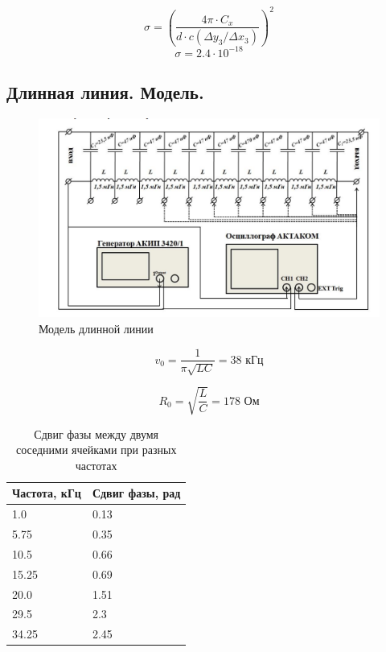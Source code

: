 \documentclass[a4paper,12 pt]{article}
\begin{document}
\begin{equation*}
\sigma=\left(\frac{4 \pi \cdot C_{x}}{d \cdot c\left(\Delta y_{3} / \Delta x_{3}\right)}\right)^{2} \tag{48}
\end{equation*}
\[\sigma = 2.4 \cdot 10^{-18}\]



\subsection{Длинная линия. Модель.}
\begin{figure}[H]
    \centering
    \includegraphics[scale=0.6]{3.png}
    \caption{Модель длинной линии}
    \label{fig:enter-label}
\end{figure}

\begin{equation*}
v_{0}=\frac{1}{\pi \sqrt{L C}} = 38 \text{ кГц} \tag{*}
\end{equation*}


\begin{equation*}
R_{0}=\sqrt{\frac{L}{C}} = 178 \text{ Ом} \tag{**}
\end{equation*}
\begin{table}[H]
    \centering
    \begin{tabular}{|p{2 cm}|p{2 cm}|}
    \hline
    Частота, кГц & Сдвиг фазы, рад \\
    \hline
         1.0  &  0.13 \\
\hline
5.75  &  0.35 \\
\hline
10.5  &  0.66 \\
\hline
15.25  &  0.69 \\
\hline
20.0  &  1.51 \\
\hline
29.5  &  2.3 \\
\hline
34.25  &  2.45 \\
\hline 
    \end{tabular}
    \caption{Сдвиг фазы между двумя соседними ячейками при разных частотах}
    \label{tab:my_label}
\end{table}
\end{document}

